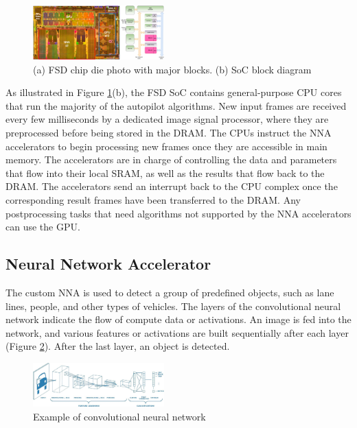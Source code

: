\documentclass[letterpaper, 10 pt, conference]{ieeeconf}  %
\begin{document}
\begin{figure}[hbt!]
\centering
\includegraphics[width=0.45\textwidth]{gfx/fsd_soc.png}
\caption{(a) FSD chip die photo with major blocks. (b) SoC block diagram}
\label{fsd_soc}
\end{figure}


As illustrated in Figure \ref{fsd_soc}(b), the FSD SoC contains general-purpose CPU cores that run the majority of the autopilot algorithms. New input frames are received every few milliseconds by a dedicated image signal processor, where they are preprocessed before being stored in the DRAM. The CPUs instruct the NNA accelerators to begin processing new frames once they are accessible in main memory. The accelerators are in charge of controlling the data and parameters that flow into their local SRAM, as well as the results that flow back to the DRAM. The accelerators send an interrupt back to the CPU complex once the corresponding result frames have been transferred to the DRAM. Any postprocessing tasks that need algorithms not supported by the NNA accelerators can use the GPU\cite{fsd_computer}.

\subsection{Neural Network Accelerator}

The custom NNA is used to detect a group of predefined objects, such as lane lines, people, and other types of vehicles. The layers of the convolutional neural network indicate the flow of compute data or activations. An image is fed into the network, and various features or activations are built sequentially after each layer (Figure \ref{cnn}). After the last layer, an object is detected\cite{saha_2018}.

\begin{figure}[hbt!]
\centering
\includegraphics[width=0.45\textwidth]{gfx/cnn.jpeg}
\caption{Example of convolutional neural network}
\label{cnn}
\end{figure}
\end{document}
